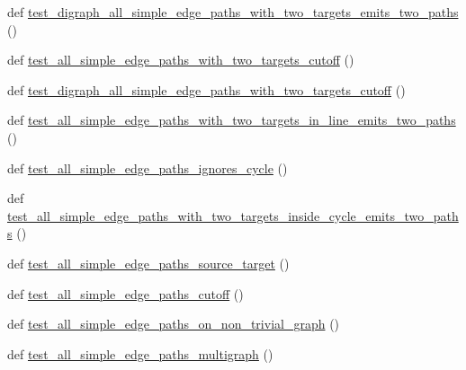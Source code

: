 \begin{DoxyCompactItemize}
\item 
def \hyperlink{namespacenetworkx_1_1algorithms_1_1tests_1_1test__simple__paths_acba1036556b396e0f11e2e4a41e74409}{test\+\_\+digraph\+\_\+all\+\_\+simple\+\_\+edge\+\_\+paths\+\_\+with\+\_\+two\+\_\+targets\+\_\+emits\+\_\+two\+\_\+paths} ()
\item 
def \hyperlink{namespacenetworkx_1_1algorithms_1_1tests_1_1test__simple__paths_ab24fa8633309e09fda88d7fd3a31bad9}{test\+\_\+all\+\_\+simple\+\_\+edge\+\_\+paths\+\_\+with\+\_\+two\+\_\+targets\+\_\+cutoff} ()
\item 
def \hyperlink{namespacenetworkx_1_1algorithms_1_1tests_1_1test__simple__paths_ab589d1475d29930df93504a7e4d1a71c}{test\+\_\+digraph\+\_\+all\+\_\+simple\+\_\+edge\+\_\+paths\+\_\+with\+\_\+two\+\_\+targets\+\_\+cutoff} ()
\item 
def \hyperlink{namespacenetworkx_1_1algorithms_1_1tests_1_1test__simple__paths_ab711b18f70f4b41ae38c39857242977a}{test\+\_\+all\+\_\+simple\+\_\+edge\+\_\+paths\+\_\+with\+\_\+two\+\_\+targets\+\_\+in\+\_\+line\+\_\+emits\+\_\+two\+\_\+paths} ()
\item 
def \hyperlink{namespacenetworkx_1_1algorithms_1_1tests_1_1test__simple__paths_a6d61d7167927c68d682d977d51253b1c}{test\+\_\+all\+\_\+simple\+\_\+edge\+\_\+paths\+\_\+ignores\+\_\+cycle} ()
\item 
def \hyperlink{namespacenetworkx_1_1algorithms_1_1tests_1_1test__simple__paths_ac0f9033d63b9a9c64461fb712db9a744}{test\+\_\+all\+\_\+simple\+\_\+edge\+\_\+paths\+\_\+with\+\_\+two\+\_\+targets\+\_\+inside\+\_\+cycle\+\_\+emits\+\_\+two\+\_\+paths} ()
\item 
def \hyperlink{namespacenetworkx_1_1algorithms_1_1tests_1_1test__simple__paths_a0b9f2b2b5d18b99d7276a087ff52d496}{test\+\_\+all\+\_\+simple\+\_\+edge\+\_\+paths\+\_\+source\+\_\+target} ()
\item 
def \hyperlink{namespacenetworkx_1_1algorithms_1_1tests_1_1test__simple__paths_ae287a30b4fa48b4c99872ca1e2fc6e2b}{test\+\_\+all\+\_\+simple\+\_\+edge\+\_\+paths\+\_\+cutoff} ()
\item 
def \hyperlink{namespacenetworkx_1_1algorithms_1_1tests_1_1test__simple__paths_a3cc43303be34f0ed0ba3f18e63cdcaf7}{test\+\_\+all\+\_\+simple\+\_\+edge\+\_\+paths\+\_\+on\+\_\+non\+\_\+trivial\+\_\+graph} ()
\item 
def \hyperlink{namespacenetworkx_1_1algorithms_1_1tests_1_1test__simple__paths_a3eaa93edcca4b5268a1db4c51fc8b549}{test\+\_\+all\+\_\+simple\+\_\+edge\+\_\+paths\+\_\+multigraph} ()
\item 

\end{DoxyCompactItemize}
